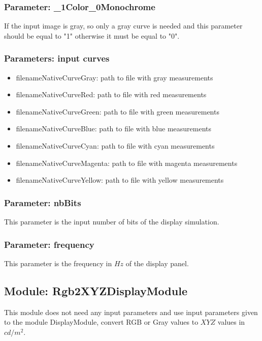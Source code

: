 \subsubsection{Parameter: \_1Color\_0Monochrome}

If the input image is gray, so only a gray curve is needed and this parameter should be equal to "1" otherwise it must be equal to "0".

\subsubsection{Parameters: input curves}

\begin{itemize}
\item filenameNativeCurveGray: path to file with gray measurements
\item filenameNativeCurveRed: path to file with red measurements
\item filenameNativeCurveGreen: path to file with green measurements
\item filenameNativeCurveBlue: path to file with blue measurements
\item filenameNativeCurveCyan: path to file with cyan measurements
\item filenameNativeCurveMagenta: path to file with magenta measurements
\item filenameNativeCurveYellow: path to file with yellow measurements
\end{itemize}

\subsubsection{Parameter: nbBits}

This parameter is the input number of bits of the display simulation.

\subsubsection{Parameter: frequency}

This parameter is the frequency in $Hz$ of the display panel.

\subsection{Module: Rgb2XYZDisplayModule}

This module does not need any input parameters and use input parameters given to the module DisplayModule, convert RGB or Gray values to $XYZ$ values in $cd/m^2$.

